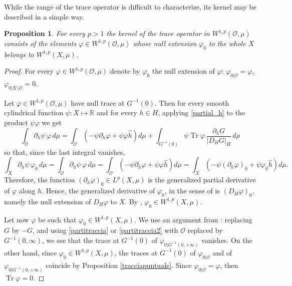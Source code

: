 \documentclass[reqno,twoside,12pt]{amsart}
\newtheorem{Proposition}[Theorem]{Proposition}
\begin{document}
While the range of the trace operator is difficult to characterize, its kernel may be described in a simple way. 

\begin{Proposition}
\label{equivalenza}
For every $p>1$ the kernel of the trace operator in $W^{1,p}({\mathcal O}, \mu)$ consists of the elements $\varphi \in W^{1,p}({\mathcal O}, \mu)$ whose null extension $\varphi_0$  to the whole $X$ belongs to $W^{1,p}(X, \mu)$.
\end{Proposition}
\begin{proof}
For every $\varphi\in W^{1,p}({\mathcal O}, \mu)$ denote by $\varphi_0$ the null extension of $\varphi$: $\varphi_{0|{\mathcal O}} = \varphi$, 
$\varphi_{0|X\setminus {\mathcal O}} = 0$. 

Let $\varphi\in W^{1,p}({\mathcal O}, \mu)$ have null trace at $G^{-1}(0)$. Then for every smooth cylindrical function $\psi:X\mapsto {\mathbb R}$ and for every $h\in H$, applying \eqref{partial_h} to the product $\psi \varphi$ we get 
$$ \int_{\mathcal O}\partial_h \psi \, \varphi\,d\mu 
= \int_{\mathcal O} (- \psi \partial_h \varphi + \psi \varphi \hat{h}) d\mu + \int_{G^{-1}(0)}\psi  {\operatorname{Tr}} \varphi \,\frac{\partial_h G}{|D_HG|_H}\,d\rho$$
so that, since the last integral vanishes, 
$$\int_X \partial_h \psi \,\varphi_0\,d\mu = \int_{\mathcal O}\partial_h \psi \, \varphi\,d\mu =
\int_{\mathcal O} (- \psi \partial_h \varphi+ \psi  \varphi \hat{h})d\mu 
= \int_{X} (- \psi (\partial_h \varphi)_0+ \psi  \varphi_0 \hat{h})d\mu .$$
Therefore, the function $(\partial_h \varphi)_0\in L^p(X, \mu)$ is the generalized partial derivative of $\varphi$ along $h$. Hence, the generalized derivative of $\varphi_0$, in the sense of \cite[Def. 5.2.9]{Boga} is  $ (D_H\varphi)_0$, namely the null extension of $D_H\varphi $ to $X$. 
By \cite[Cor. 5.4.7]{Boga}, $\varphi_0 \in W^{1,p}(X,  \mu)$. 

Let now $\varphi$ be such that $\varphi_0\in W^{1,p}(X,  \mu)$. We use an argument from \cite{DPL}: replacing $G$ by $-G$, and using \eqref{partitraccia} or \eqref{partitraccia2} with ${\mathcal O}$ replaced by $G^{-1}(0, \infty)$, we see that the trace at $G^{-1}(0)$ of $\varphi_{0|G^{-1}(0, +\infty)}$ vanishes. On the other hand, since $\varphi_0 \in W^{1,p}(X,  \mu)$, the traces at $G^{-1}(0)$ of  $ \varphi_{0| {\mathcal O}}$ and of $ \varphi_{0|G^{-1}(0, +\infty)}$ coincide by Proposition \ref{tracciapuntuale}. Since $ \varphi_{0|  {\mathcal O}}=\varphi$, 
then ${\operatorname{Tr}} \varphi =0$. 
\end{proof}
\end{document}
